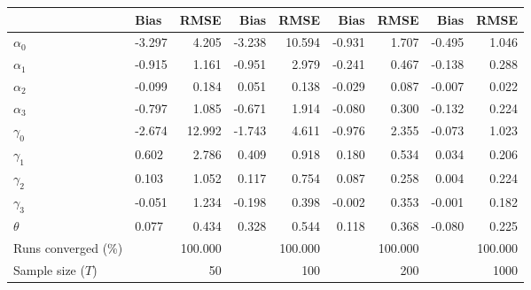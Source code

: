 
\begin{tabular}[t]{llrrrrrrr}
\toprule
  & Bias & RMSE & Bias & RMSE & Bias & RMSE & Bias & RMSE\\
\midrule
$\alpha_{0}$ & -3.297 & 4.205 & -3.238 & 10.594 & -0.931 & 1.707 & -0.495 & 1.046\\
$\alpha_{1}$ & -0.915 & 1.161 & -0.951 & 2.979 & -0.241 & 0.467 & -0.138 & 0.288\\
$\alpha_{2}$ & -0.099 & 0.184 & 0.051 & 0.138 & -0.029 & 0.087 & -0.007 & 0.022\\
$\alpha_{3}$ & -0.797 & 1.085 & -0.671 & 1.914 & -0.080 & 0.300 & -0.132 & 0.224\\
$\gamma_{0}$ & -2.674 & 12.992 & -1.743 & 4.611 & -0.976 & 2.355 & -0.073 & 1.023\\
$\gamma_{1}$ & 0.602 & 2.786 & 0.409 & 0.918 & 0.180 & 0.534 & 0.034 & 0.206\\
$\gamma_{2}$ & 0.103 & 1.052 & 0.117 & 0.754 & 0.087 & 0.258 & 0.004 & 0.224\\
$\gamma_{3}$ & -0.051 & 1.234 & -0.198 & 0.398 & -0.002 & 0.353 & -0.001 & 0.182\\
$\theta$ & 0.077 & 0.434 & 0.328 & 0.544 & 0.118 & 0.368 & -0.080 & 0.225\\
Runs converged (\%) &  & 100.000 &  & 100.000 &  & 100.000 &  & 100.000\\
Sample size ($T$) &  & 50 &  & 100 &  & 200 &  & 1000\\
\bottomrule
\end{tabular}
